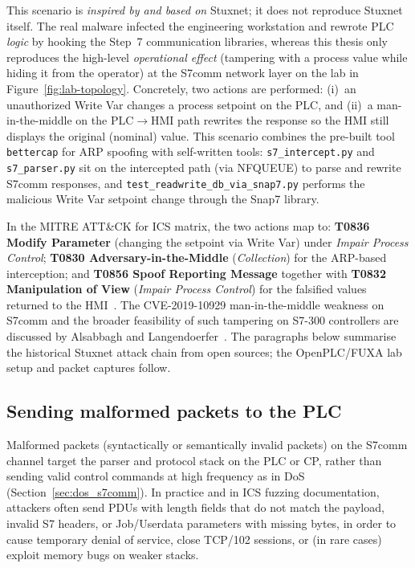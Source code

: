 ﻿\documentclass[../main.tex]{subfiles}
\begin{document}
This scenario is \emph{inspired by and based on} Stuxnet; it does not reproduce Stuxnet itself. The real malware infected the engineering workstation and rewrote PLC \emph{logic} by hooking the Step~7 communication libraries, whereas this thesis only reproduces the high-level \emph{operational effect} (tampering with a process value while hiding it from the operator) at the S7comm network layer on the lab in Figure~\ref{fig:lab-topology}. Concretely, two actions are performed: (i)~an unauthorized Write Var changes a process setpoint on the PLC, and (ii)~a man-in-the-middle on the PLC$\rightarrow$HMI path rewrites the response so the HMI still displays the original (nominal) value. This scenario combines the pre-built tool \texttt{bettercap} for ARP spoofing with self-written tools: \texttt{s7\_intercept.py} and \texttt{s7\_parser.py} sit on the intercepted path (via NFQUEUE) to parse and rewrite S7comm responses, and \texttt{test\_readwrite\_db\_via\_snap7.py} performs the malicious Write Var setpoint change through the Snap7 library.

In the MITRE ATT\&CK for ICS matrix, the two actions map to: \textbf{T0836 Modify Parameter} (changing the setpoint via Write Var) under \emph{Impair Process Control}; \textbf{T0830 Adversary-in-the-Middle} (\emph{Collection}) for the ARP-based interception; and \textbf{T0856 Spoof Reporting Message} together with \textbf{T0832 Manipulation of View} (\emph{Impair Process Control}) for the falsified values returned to the HMI~\cite{mitre_ics_attack}. The CVE-2019-10929 man-in-the-middle weakness on S7comm and the broader feasibility of such tampering on S7-300 controllers are discussed by Alsabbagh and Langendoerfer~\cite{alsabbagh2022remote}. The paragraphs below summarise the historical Stuxnet attack chain from open sources; the OpenPLC/FUXA lab setup and packet captures follow.



\setcounter{subsubsection}{0}

\subsection{Sending malformed packets to the PLC}
\label{sec:malformed_plc}

Malformed packets (syntactically or semantically invalid packets) on the S7comm channel target the parser and protocol stack on the PLC or CP, rather than sending valid control commands at high frequency as in DoS (Section~\ref{sec:dos_s7comm}). In practice and in ICS fuzzing documentation, attackers often send PDUs with length fields that do not match the payload, invalid S7 headers, or Job/Userdata parameters with missing bytes, in order to cause temporary denial of service, close TCP/102 sessions, or (in rare cases) exploit memory bugs on weaker stacks.
\end{document}
